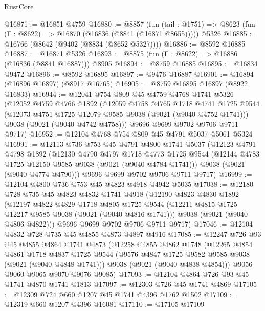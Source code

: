 \begin{lexlean}{RustCore}
\begin{coremodule}
@16871 := @16851 @4759
@16880 := @8857
    (fun (tail : @1751) => @8623 (fun (Γ : @8622) => @16870 (@16836 (@8841 (@16871 @8655)))))
    @5326
@16885 := @16766 (@8642 (@9402 (@8834 (@8652 @5327))))
@16886 := @8592 @16885
@16887 := @16871 @5326
@16893 := @8875 (fun (Γ : @8622) => @16886 (@16836 (@8841 @16887))) @8905
@16894 := @8759 @16885
@16895 := @16834 @9472
@16896 := @8592 @16895
@16897 := @9476 @16887
@16901 := @16894 (@16896 @16897) (@8917 @16765)
@16905 := @8759 @16895 @16897 (@8922 @16833)
@16944 := @12041
    @754
    @809
    @45
    @4759
    @4768
    @1741
    @5326
    (@12052
      @4759
      @4766
      @1892
      (@12059
        @4758
        @4765
        @1718
        @4741
        @1725
        @9544
        (@12073 @4751 @1725 @12079 @9585 @9038 (@9021 (@9040 @4752 @1741)))
        @9038
        (@9021 (@9040 @4742 @4758)))
      @9696
      @9699
      @9702
      @9706
      @9711
      @9717)
@16952 := @12104 @4768 @754 @809 @45 @4791 @5037 @5061 @5324
@16991 := @12113
    @736
    @753
    @45
    @4791
    @4800
    @1741
    @5037
    (@12123
      @4791
      @4798
      @1892
      (@12130
        @4790
        @4797
        @1718
        @4773
        @1725
        @9544
        (@12144 @4783 @1725 @12150 @9585 @9038 (@9021 (@9040 @4784 @1741)))
        @9038
        (@9021 (@9040 @4774 @4790)))
      @9696
      @9699
      @9702
      @9706
      @9711
      @9717)
@16999 := @12104 @4800 @736 @753 @45 @4823 @4918 @4942 @5035
@17038 := @12180
    @728
    @735
    @45
    @4823
    @4832
    @1741
    @4918
    (@12190
      @4823
      @4830
      @1892
      (@12197
        @4822
        @4829
        @1718
        @4805
        @1725
        @9544
        (@12211 @4815 @1725 @12217 @9585 @9038 (@9021 (@9040 @4816 @1741)))
        @9038
        (@9021 (@9040 @4806 @4822)))
      @9696
      @9699
      @9702
      @9706
      @9711
      @9717)
@17046 := @12104 @4832 @728 @735 @45 @4855 @4873 @4897 @4916
@17085 := @12247
    @726
    @93
    @45
    @4855
    @4864
    @1741
    @4873
    (@12258
      @4855
      @4862
      @1748
      (@12265
        @4854
        @4861
        @1718
        @4837
        @1725
        @9544
        (@9576 @4847 @1725 @9582 @9585 @9038 (@9021 (@9040 @4848 @1741)))
        @9038
        (@9021 (@9040 @4838 @4854)))
      @9056
      @9060
      @9065
      @9070
      @9076
      @9085)
@17093 := @12104 @4864 @726 @93 @45 @1741 @4870 @1741 @1813
@17097 := @12303 @726 @45 @1741 @4869
@17105 := @12309 @724 @660 @1207 @45 @1741 @4396 @1762 @1502
@17109 := @12319 @660 @1207 @4396 @16081
@17110 := @17105 @17109

\end{coremodule}
\end{lexlean}
